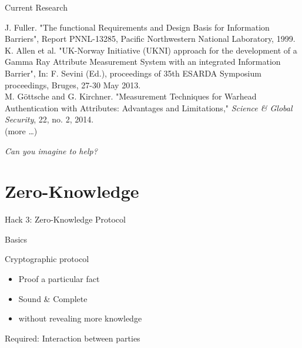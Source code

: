 \documentclass[presentation]{beamer}
\begin{document}
\begin{frame}[label=sec-4-6]{Current Research}
\footnotesize

J. Fuller. "The functional Requirements and Design Basis for Information Barriers", Report PNNL-13285, Pacific Northwestern National Laboratory, 1999.\\[0.3em]

K. Allen et al. "UK-Norway Initiative (UKNI) approach for the development of a Gamma Ray Attribute Measurement System with an integrated Information Barrier", In: F. Sevini (Ed.), proceedings of 35th ESARDA Symposium proceedings, Bruges, 27-30 May 2013.\\[0.3em]

M. Göttsche and G. Kirchner. "Measurement Techniques for Warhead Authentication with Attributes: Advantages and Limitations," \emph{Science \& Global Security}, 22, no. 2, 2014.\\[0.3em]

(more \ldots{})


\pause

\vspace{1cm}

\begin{center}
\emph{Can you imagine to help?}
\end{center}
\end{frame}

\section{Zero-Knowledge}
\label{sec-5}
\begin{frame}[label=sec-5-1]{}
\begin{center}
Hack 3: Zero-Knowledge Protocol
\end{center}
\end{frame}
\begin{frame}[label=sec-5-2]{Basics}
\begin{block}{Cryptographic protocol}
\begin{itemize}
\item Proof a particular fact
\item Sound \& Complete
\item without revealing more knowledge
\end{itemize}

Required: \alert{Interaction} between parties
\end{block}
\end{frame}
\end{document}
